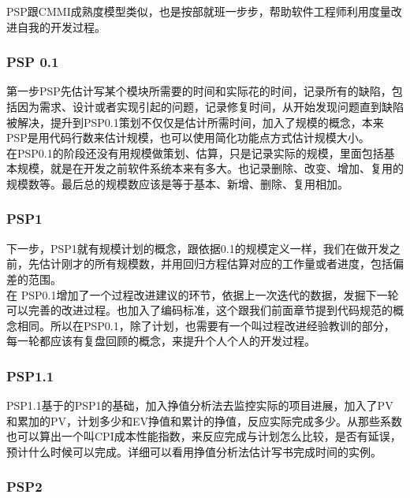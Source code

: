 PSP跟CMMI成熟度模型类似，也是按部就班一步步，帮助软件工程师利用度量改进自我的开发过程。

\hypertarget{psp-0.1}{%
\subsubsection{PSP 0.1}\label{psp-0.1}}

第一步PSP先估计写某个模块所需要的时间和实际花的时间，记录所有的缺陷，包括因为需求、设计或者实现引起的问题，记录修复时间，从开始发现问题直到缺陷被解决，提升到PSP0.1策划不仅仅是估计所需时间，加入了规模的概念，本来PSP是用代码行数来估计规模，也可以使用简化功能点方式估计规模大小。\\
在PSP0.1的阶段还没有用规模做策划、估算，只是记录实际的规模，里面包括基本规模，就是在开发之前软件系统本来有多大。也记录删除、改变、增加、复用的规模数等。最后总的规模数应该是等于基本、新增、删除、复用相加。

\hypertarget{psp1}{%
\subsubsection{PSP1}\label{psp1}}

下一步，PSP1就有规模计划的概念，跟依据0.1的规模定义一样，我们在做开发之前，先估计刚才的所有规模数，并用回归方程估算对应的工作量或者进度，包括偏差的范围。\\
在
PSP0.1增加了一个过程改进建议的环节，依据上一次迭代的数据，发掘下一轮可以完善的改进过程。也加入了编码标准，这个跟我们前面章节提到代码规范的概念相同。所以在PSP0.1，除了计划，也需要有一个叫过程改进经验教训的部分，每一轮都应该有复盘回顾的概念，来提升个人个人的开发过程。

\hypertarget{psp1.1}{%
\subsubsection{PSP1.1}\label{psp1.1}}

PSP1.1基于的PSP1的基础，加入挣值分析法去监控实际的项目进展，加入了PV和累加的PV，计划多少和EV挣值和累计的挣值，反应实际完成多少。从那些系数也可以算出一个叫CPI成本性能指数，来反应完成与计划怎么比较，是否有延误，预计什么时候可以完成。详细可以看用挣值分析法估计写书完成时间的实例。

\hypertarget{psp2}{%
\subsubsection{PSP2}\label{psp2}}

